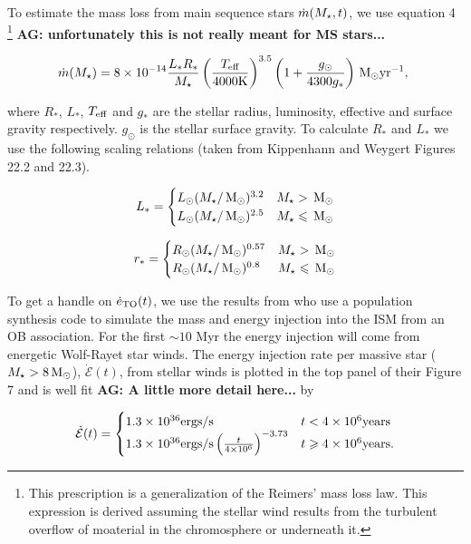 To estimate the mass loss from main sequence stars
$\dot{m}(M_{\star}, t)$,
we use equation 4 \citet{SchroderCuntz:2005a}\footnote{This
  prescription is a generalization of the Reimers' mass loss law. This
expression is derived assuming the stellar wind results from the
turbulent overflow of moaterial in the chromosphere or underneath it.} {\bf AG:
  unfortunately this is not really meant for MS stars...}

\begin{align}
  \dot{m}(M_{\star})=8 \times 10^{-14} \frac{L_* R_*}{M_{\star}}
  \left(\frac{T_{\rm eff}}{\rm 4000 K}\right)^{3.5}
  \left(1+\frac{g_{\odot}}{4300 g_*}\right) \,{\rm M_\odot} {\rm yr}^{-1},\
\end{align}

where  $R_*$, $L_*$, $T_{\rm eff}$ and $g_*$ are the stellar radius,
luminosity, effective and surface gravity respectively. $g_{\odot}$ is
the stellar surface gravity. To calculate $R_*$ and $L_*$ we use the
following scaling relations (taken from Kippenhann and Weygert Figures
22.2 and 22.3).

\begin{align}
L_*=
\begin{cases}
L_{\odot} (M_{\star}/\,{\rm M_\odot})^{3.2} & M_{\star} > \,{\rm M_\odot} \\
L_{\odot} (M_{\star}/\,{\rm M_\odot})^{2.5} & M_{\star} \leqslant \,{\rm M_\odot}
\end{cases}
\end{align}

\begin{align}
r_*=
\begin{cases}
R_{\odot} (M_{\star}/\,{\rm M_\odot})^{0.57} & M_{\star} > \,{\rm M_\odot} \\
R_{\odot} (M_{\star}/\,{\rm M_\odot})^{0.8} & M_{\star} \leqslant \,{\rm M_\odot}
\end{cases}
\end{align}


To get a handle on $\dot{e}_{\rm TO}(t)$, we use the results from
\citet{VossDiehl+:2009a} who use a population synthesis code to
simulate the mass and energy injection into the ISM from an OB
association. For the first $\sim 10$ Myr the energy injection will
come from energetic Wolf-Rayet star winds. The energy injection rate
per massive star ($M_{\star}>8 \,{\rm M_\odot}$), $\dot{\mathcal{E}} (t)$, from
stellar winds is plotted in the top panel of their Figure 7 and is
well fit {\bf AG: A little more detail here...} by

\begin{align}
\dot{\mathcal{E}} (t)=
\begin{cases}
  1.3 \times 10^{36} {\rm ergs/s} & t<4 \times 10^6 {\rm years}\\
  1.3  \times 10^{36} {\rm ergs/s} \left(\frac{t}{4 \times  10^6}\right)^{-3.73} & t \ge 4 \times 10^6 {\rm years}.
\end{cases}
\label{eq:voss}
\end{align}

